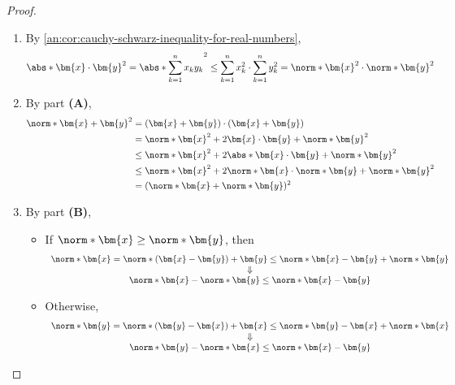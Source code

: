 \begin{proof}
  \leavevmode\par
  \begin{enumerate}[label=\textbf{(\Alph*)}]
    \item By \cref{an:cor:cauchy-schwarz-inequality-for-real-numbers},
          \[
            \abs*{\bm{x} \cdot \bm{y}}^{2} = \abs*{\sum_{k = 1}^{n} x_{k}y_{k}}^{2} \leq
            \sum_{k = 1}^{n} x_{k}^{2} \cdot \sum_{k = 1}^{n} y_{k}^{2}
            = \norm*{\bm{x}}^{2} \cdot \norm*{\bm{y}}^{2}
          \]
    \item By part \textbf{(A)},
          \begin{align*}
            \norm*{\bm{x} + \bm{y}}^{2}
             & = (\bm{x} + \bm{y}) \cdot (\bm{x} + \bm{y})                                         \\
             & = \norm*{\bm{x}}^{2} + 2\bm{x} \cdot \bm{y} + \norm*{\bm{y}}^{2}                    \\
             & \leq \norm*{\bm{x}}^{2} + 2\abs*{\bm{x} \cdot \bm{y}} + \norm*{\bm{y}}^{2}          \\
             & \leq \norm*{\bm{x}}^{2} + 2\norm*{\bm{x}} \cdot \norm*{\bm{y}} + \norm*{\bm{y}}^{2} \\
             & = (\norm*{\bm{x}} + \norm*{\bm{y}})^{2}
          \end{align*}
    \item By part \textbf{(B)},
          \begin{itemize}
            \item If $\norm*{\bm{x}} \geq \norm*{\bm{y}}$, then
                  \[
                    \begin{array}{c}
                      \norm*{\bm{x}} = \norm*{(\bm{x} - \bm{y}) + \bm{y}}
                      \leq \norm*{\bm{x} - \bm{y}} + \norm*{\bm{y}} \\
                      \Downarrow                                    \\
                      \norm*{\bm{x}} - \norm*{\bm{y}} \leq \norm*{\bm{x} - \bm{y}}
                    \end{array}
                  \]
            \item Otherwise,
                  \[
                    \begin{array}{c}
                      \norm*{\bm{y}} = \norm*{(\bm{y} - \bm{x}) + \bm{x}}
                      \leq \norm*{\bm{y} - \bm{x}} + \norm*{\bm{x}} \\
                      \Downarrow                                    \\
                      \norm*{\bm{y}} - \norm*{\bm{x}} \leq \norm*{\bm{x} - \bm{y}}
                    \end{array}
                  \]
          \end{itemize}
  \end{enumerate}
\end{proof}
